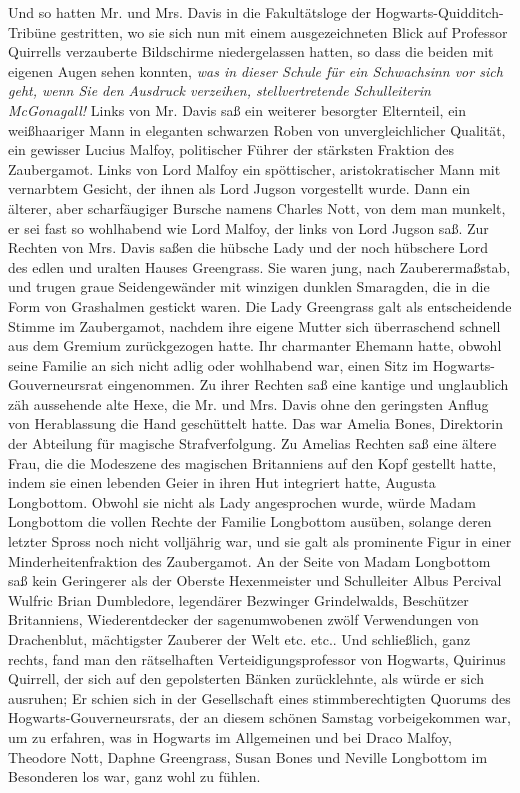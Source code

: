 Und so hatten Mr. und Mrs. Davis in die Fakultätsloge der
Hogwarts-Quidditch-Tribüne gestritten, wo sie sich nun mit einem ausgezeichneten
Blick auf Professor Quirrells verzauberte Bildschirme niedergelassen hatten, so
dass die beiden mit eigenen Augen sehen konnten, \glqq{}\emph{was in dieser
Schule für ein Schwachsinn vor sich geht, wenn Sie den Ausdruck verzeihen,
stellvertretende Schulleiterin McGonagall!}\grqq{} Links von Mr. Davis saß ein
weiterer besorgter Elternteil, ein weißhaariger Mann in eleganten schwarzen
Roben von unvergleichlicher Qualität, ein gewisser Lucius Malfoy, politischer
Führer der stärksten Fraktion des Zaubergamot. Links von Lord Malfoy ein
spöttischer, aristokratischer Mann mit vernarbtem Gesicht, der ihnen als Lord
Jugson vorgestellt wurde. Dann ein älterer, aber scharfäugiger Bursche namens
Charles Nott, von dem man munkelt, er sei fast so wohlhabend wie Lord Malfoy,
der links von Lord Jugson saß. Zur Rechten von Mrs. Davis saßen die hübsche Lady
und der noch hübschere Lord des edlen und uralten Hauses Greengrass. Sie waren
jung, nach Zauberermaßstab, und trugen graue Seidengewänder mit winzigen dunklen
Smaragden, die in die Form von Grashalmen gestickt waren. Die Lady Greengrass
galt als entscheidende Stimme im Zaubergamot, nachdem ihre eigene Mutter sich
überraschend schnell aus dem Gremium zurückgezogen hatte. Ihr charmanter Ehemann
hatte, obwohl seine Familie an sich nicht adlig oder wohlhabend war, einen Sitz
im Hogwarts-Gouverneursrat eingenommen. Zu ihrer Rechten saß eine kantige und
unglaublich zäh aussehende alte Hexe, die Mr. und Mrs. Davis ohne den geringsten
Anflug von Herablassung die Hand geschüttelt hatte. Das war Amelia Bones,
Direktorin der Abteilung für magische Strafverfolgung. Zu Amelias Rechten saß
eine ältere Frau, die die Modeszene des magischen Britanniens auf den Kopf
gestellt hatte, indem sie einen lebenden Geier in ihren Hut integriert hatte,
Augusta Longbottom. Obwohl sie nicht als Lady angesprochen wurde, würde Madam
Longbottom die vollen Rechte der Familie Longbottom ausüben, solange deren
letzter Spross noch nicht volljährig war, und sie galt als prominente Figur in
einer Minderheitenfraktion des Zaubergamot. An der Seite von Madam Longbottom
saß kein Geringerer als der Oberste Hexenmeister und Schulleiter Albus Percival
Wulfric Brian Dumbledore, legendärer Bezwinger Grindelwalds, Beschützer
Britanniens, Wiederentdecker der sagenumwobenen zwölf Verwendungen von
Drachenblut, mächtigster Zauberer der Welt etc. etc.. Und schließlich, ganz
rechts, fand man den rätselhaften Verteidigungsprofessor von Hogwarts, Quirinus
Quirrell, der sich auf den gepolsterten Bänken zurücklehnte, als würde er sich
ausruhen; Er schien sich in der Gesellschaft eines stimmberechtigten Quorums des
Hogwarts-Gouverneursrats, der an diesem schönen Samstag vorbeigekommen war, um
zu erfahren, was in Hogwarts im Allgemeinen und bei Draco Malfoy, Theodore Nott,
Daphne Greengrass, Susan Bones und Neville Longbottom im Besonderen los war,
ganz wohl zu fühlen.

